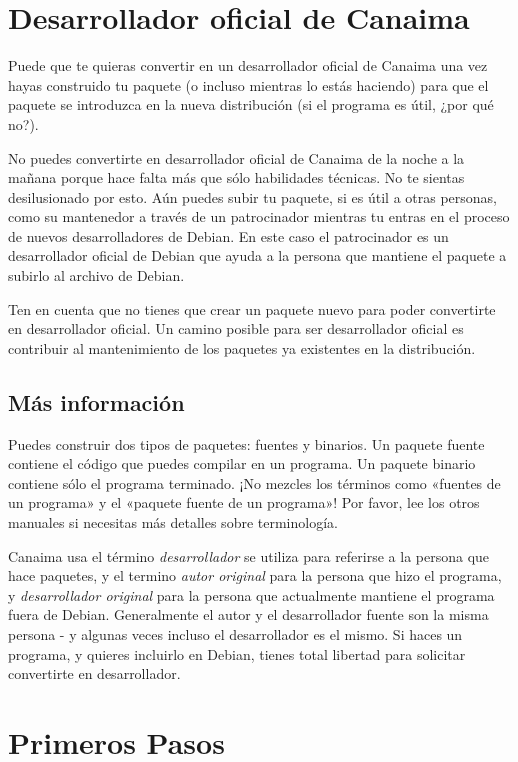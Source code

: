 \documentclass[letterpaper,12pt,spanish]{manual}
\begin{document}
\section{\textbf{Desarrollador oficial de Canaima}}

Puede que te quieras convertir en un desarrollador oficial de Canaima una vez hayas construido tu paquete (o incluso mientras lo estás haciendo) para que el paquete se introduzca en la nueva distribución (si el programa es útil, ¿por qué no?).

No puedes convertirte en desarrollador oficial de Canaima de la noche a la mañana porque hace falta más que sólo habilidades técnicas. No te sientas desilusionado por esto. Aún puedes subir tu paquete, si es útil a otras personas, como su mantenedor a través de un patrocinador mientras tu entras en el proceso de nuevos desarrolladores de Debian. En este caso el patrocinador es un desarrollador oficial de Debian que ayuda a la persona que mantiene el paquete a subirlo al archivo de Debian.

Ten en cuenta que no tienes que crear un paquete nuevo para poder convertirte en desarrollador oficial. Un camino posible para ser desarrollador oficial es contribuir al mantenimiento de los paquetes ya existentes en la distribución.


\subsection{Más información}

Puedes construir dos tipos de paquetes: fuentes y binarios. Un paquete fuente contiene el código que puedes compilar en un programa. Un paquete binario contiene sólo el programa terminado. ¡No mezcles los términos como «fuentes de un programa» y el «paquete fuente de un programa»! Por favor, lee los otros manuales si necesitas más detalles sobre terminología.

Canaima usa el término \emph{desarrollador} se utiliza para referirse a la persona que hace paquetes, y el termino \emph{autor original} para la persona que hizo el programa, y \emph{desarrollador original} para la persona que actualmente mantiene el programa fuera de Debian. Generalmente el autor y el desarrollador fuente son la misma persona - y algunas veces incluso el desarrollador es el mismo. Si haces un programa, y quieres incluirlo en Debian, tienes total libertad para solicitar convertirte en desarrollador.


\section{\textbf{Primeros Pasos}}
\end{document}
